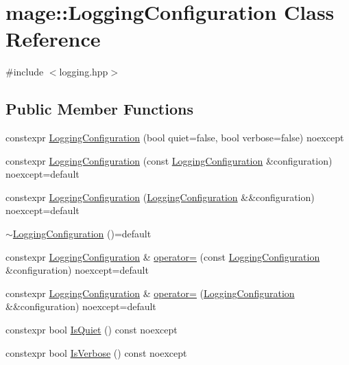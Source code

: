\hypertarget{classmage_1_1_logging_configuration}{}\section{mage\+:\+:Logging\+Configuration Class Reference}
\label{classmage_1_1_logging_configuration}


{\ttfamily \#include $<$logging.\+hpp$>$}

\subsection*{Public Member Functions}
\begin{DoxyCompactItemize}
\item 
constexpr \mbox{\hyperlink{classmage_1_1_logging_configuration_a506696943c69d6a56ceef5802e0546ba}{Logging\+Configuration}} (bool quiet=false, bool verbose=false) noexcept
\item 
constexpr \mbox{\hyperlink{classmage_1_1_logging_configuration_a4aa9ae2ac1805e062c2b224b1c65ca85}{Logging\+Configuration}} (const \mbox{\hyperlink{classmage_1_1_logging_configuration}{Logging\+Configuration}} \&configuration) noexcept=default
\item 
constexpr \mbox{\hyperlink{classmage_1_1_logging_configuration_a7cd5793f3a568c82fe29c33ee66aeb14}{Logging\+Configuration}} (\mbox{\hyperlink{classmage_1_1_logging_configuration}{Logging\+Configuration}} \&\&configuration) noexcept=default
\item 
\mbox{\hyperlink{classmage_1_1_logging_configuration_a842cd1d5cf22c9fb6e2c76e684cd08ee}{$\sim$\+Logging\+Configuration}} ()=default
\item 
constexpr \mbox{\hyperlink{classmage_1_1_logging_configuration}{Logging\+Configuration}} \& \mbox{\hyperlink{classmage_1_1_logging_configuration_a17aa265307f73f3c5f96e35e30c0b437}{operator=}} (const \mbox{\hyperlink{classmage_1_1_logging_configuration}{Logging\+Configuration}} \&configuration) noexcept=default
\item 
constexpr \mbox{\hyperlink{classmage_1_1_logging_configuration}{Logging\+Configuration}} \& \mbox{\hyperlink{classmage_1_1_logging_configuration_aeeb70ca4119118f90c7ca4b9cb712f11}{operator=}} (\mbox{\hyperlink{classmage_1_1_logging_configuration}{Logging\+Configuration}} \&\&configuration) noexcept=default
\item 
constexpr bool \mbox{\hyperlink{classmage_1_1_logging_configuration_a1096a1ef5f9237fb76fc5937ac1a1210}{Is\+Quiet}} () const noexcept
\item 
constexpr bool \mbox{\hyperlink{classmage_1_1_logging_configuration_abd81834c6938be1b32a7bd6eb08d5242}{Is\+Verbose}} () const noexcept
\end{DoxyCompactItemize}
